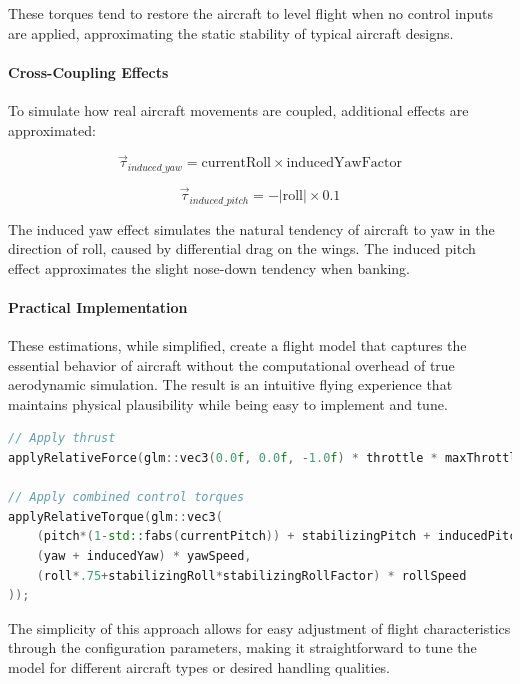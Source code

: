 These torques tend to restore the aircraft to level flight when no control inputs are applied, approximating the static stability of typical aircraft designs.

\paragraph{Cross-Coupling Effects}
To simulate how real aircraft movements are coupled, additional effects are approximated:

\begin{equation}
\vec{\tau}_{induced\_yaw} = \text{currentRoll} \times \text{inducedYawFactor}
\end{equation}

\begin{equation}
\vec{\tau}_{induced\_pitch} = -|\text{roll}| \times 0.1
\end{equation}

The induced yaw effect simulates the natural tendency of aircraft to yaw in the direction of roll, caused by differential drag on the wings. The induced pitch effect approximates the slight nose-down tendency when banking.

\paragraph{Practical Implementation}
These estimations, while simplified, create a flight model that captures the essential behavior of aircraft without the computational overhead of true aerodynamic simulation. The result is an intuitive flying experience that maintains physical plausibility while being easy to implement and tune.

\begin{lstlisting}[language=C++, caption={Force application in update method}, label=src:force_application]
// Apply thrust
applyRelativeForce(glm::vec3(0.0f, 0.0f, -1.0f) * throttle * maxThrottle);

// Apply combined control torques
applyRelativeTorque(glm::vec3(
    (pitch*(1-std::fabs(currentPitch)) + stabilizingPitch + inducedPitch) * pitchSpeed,
    (yaw + inducedYaw) * yawSpeed,
    (roll*.75+stabilizingRoll*stabilizingRollFactor) * rollSpeed
));
\end{lstlisting}

The simplicity of this approach allows for easy adjustment of flight characteristics through the configuration parameters, making it straightforward to tune the model for different aircraft types or desired handling qualities.